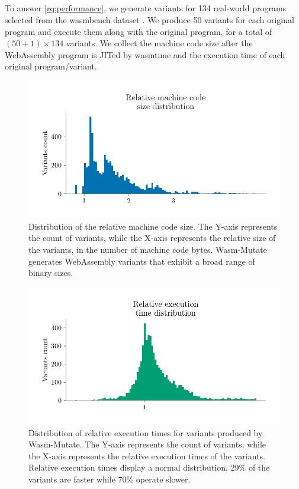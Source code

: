 \documentclass[a4paper,fleqn]{cas-dc}
\newcommand{\tool}{{\sc Wasm-Mutate}\xspace}
\newcommand{\Wasm}{WebAssembly\xspace}
\newenvironment{revision1}{\color{blue}}{}
\begin{document}
\begin{revision1}
\subsection{\rqperformance}



To answer \ref{rq:performance}, we generate variants for 134 real-world programs selected from the wasmbench dataset \cite{hilbig2021empirical}.
We produce 50 variants for each original program and execute them along with the original program, for a total of $(50 + 1)\times134$ variants.
We collect the machine code size after the \Wasm program is JITed by wasmtime and the execution time of each original program/variant.


\begin{figure}
    \centering
    \includegraphics[width=\linewidth]{plots/rq4/mcsize.pdf}
    \caption{\color{blue}Distribution of the relative machine code size.
The Y-axis represents the count of variants, while the X-axis represents the relative size of the variants, in the number of machine code bytes. \tool generates \Wasm variants that exhibit a broad range of binary sizes.}
  \label{impact:mcsize}
\end{figure} %


\begin{figure}
    \centering
    \includegraphics[width=\linewidth]{plots/rq4/ext.pdf}
    \caption{\color{blue}Distribution of relative execution times for variants produced by \tool.
The Y-axis represents the count of variants, while the X-axis represents the relative execution times of the variants. Relative execution times display a normal distribution, 29\% of the variants are faster while 70\% operate slower. }
  \label{impact:time}
\end{figure}


\end{revision1}
\end{document}
